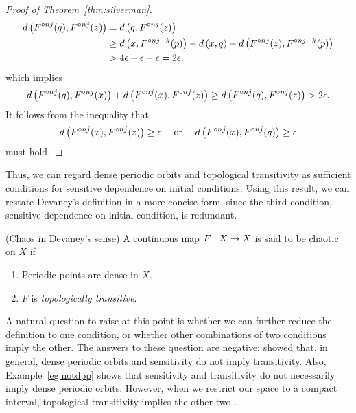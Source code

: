 \documentclass[12pt,draft,twoside]{book}
\begin{document}
\begin{proof}[Proof of Theorem~\ref{thm:silverman}]
\begin{align*}
    d\left( F^{\circ nj}(q), F^{\circ nj}(z) \right) 
    &= d\left( q, F^{\circ nj}(z) \right)  \\
    &\geq  d\left( x, F^{\circ nj-k}(p) \right) - d\left( x,q \right) - d\left( F^{\circ nj}(z), F^{\circ nj - k}(p) \right)  \\
    &> 4\epsilon - \epsilon - \epsilon 
    = 2\epsilon,
  \end{align*}
  which implies
  \begin{equation*}
    d\left( F^{\circ nj}(q), F^{\circ nj}(x) \right) + d\left( F^{\circ nj}(x), F^{\circ nj}(z) \right) 
    \geq d\left( F^{\circ nj}(q), F^{\circ nj}(z) \right)
    > 2\epsilon.
  \end{equation*}
  It follows from the inequality that 
  \begin{equation*}
    d\left( F^{\circ nj}(x), F^{\circ nj}(z) \right) \geq \epsilon \quad\mbox{ or }\quad d\left( F^{\circ nj}(x), F^{\circ nj}(q) \right) \geq \epsilon 
  \end{equation*}
  must hold.
\end{proof}

Thus, we can regard dense periodic orbits and topological transitivity as sufficient conditions for sensitive dependence on initial conditions.
Using this result, we can restate Devaney's definition in a more concise form, since the third condition, sensitive dependence on initial condition, is redundant.
\begin{definition}
  (Chaos in Devaney's sense) 
  A continuous map $F: X\rightarrow X$ is said to be chaotic on $X$ if
  \begin{enumerate}
    \item Periodic points are dense in $X$.
    \item $F$ is \textit{topologically transitive}.
  \end{enumerate}
\end{definition}
A natural question to raise at this point is whether we can further reduce the definition to one condition, or whether other combinations of two conditions imply the other.
The answers to these question are negative; \citet{assaf} showed that, in general, dense periodic orbits and sensitivity do not imply transitivity.
Also, Example~\ref{eg:notdpp} shows that sensitivity and transitivity do not necessarily imply dense periodic orbits.
However, when we restrict our space to a compact interval, topological transitivity implies the other two \citep{silverman}.
\end{document}
